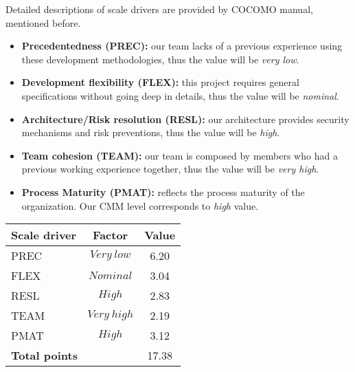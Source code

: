 Detailed descriptions of scale drivers are provided by COCOMO manual, mentioned before.

\begin{itemize}
	
	\item\textbf{Precedentedness (PREC):} our team lacks of a previous experience using these development methodologies, thus the value will be \textit{very low}.
	
	\item\textbf{Development flexibility (FLEX):} this project requires general specifications without going deep in details, thus the value will be \textit{nominal}.
	
	\item\textbf{Architecture/Risk resolution (RESL):} our architecture provides security mechanisms and risk preventions, thus the value will be \textit{high}.
	
	\item\textbf{Team cohesion (TEAM):} our team is composed by members who had a previous working experience together, thus the value will be \textit{very high}.
	
	\item\textbf{Process Maturity (PMAT):} reflects the process maturity of the organization. Our CMM level corresponds to \textit{high} value. 
	
\end{itemize}

\vspace{10mm}

\begin{center}
	\begin{tabular}{| l | c | c |}
		\hline
		\textbf{Scale driver} & \textbf{Factor} & \textbf{Value} \\ \hline
		PREC & $Very\ low$ & 6.20\\ \hline
		FLEX & $Nominal$ & 3.04\\ \hline
		RESL & $High$ & 2.83\\ \hline
		TEAM & $Very\ high$ & 2.19\\ \hline
		PMAT & $High$ & 3.12\\ \hline
		\multicolumn{2}{|l|}{\textbf{Total points}} & 17.38\\ \hline
	\end{tabular}
\end{center}
